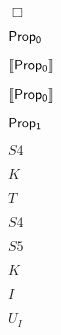 \documentclass[10pt]{book}
\begin{document}
\begin{mdSnippets}
\begin{mdInlineSnippet}[c3880bc63c2b0fd10cdc024cf76a1924]%
$\Box$\end{mdInlineSnippet}%
\begin{mdInlineSnippet}[c09859c00da566980873081e8d77a317]%
${\sf Prop_0}$\end{mdInlineSnippet}%
\begin{mdInlineSnippet}[6abfdac12c5881728b0774166e4c6328]%
$\llbracket{\sf Prop_0}\rrbracket$\end{mdInlineSnippet}%
\begin{mdInlineSnippet}[6abfdac12c5881728b0774166e4c6328]%
$\llbracket{\sf Prop_0}\rrbracket$\end{mdInlineSnippet}%
\begin{mdInlineSnippet}[1adbe235087fa8958bc806a79b07b5cf]%
${\sf Prop_1}$\end{mdInlineSnippet}%
\begin{mdInlineSnippet}%
$S4$\end{mdInlineSnippet}%
\begin{mdInlineSnippet}[a5f3c6a11b03839d46af9fb43c97c188]%
$K$\end{mdInlineSnippet}%
\begin{mdInlineSnippet}%
$T$\end{mdInlineSnippet}%
\begin{mdInlineSnippet}%
$S4$\end{mdInlineSnippet}%
\begin{mdInlineSnippet}[79e6fb8fb2403b9688924408f7dc4857]%
$S5$\end{mdInlineSnippet}%
\begin{mdInlineSnippet}[a5f3c6a11b03839d46af9fb43c97c188]%
$K$\end{mdInlineSnippet}%
\begin{mdInlineSnippet}[dd7536794b63bf90eccfd37f9b147d7f]%
$I$\end{mdInlineSnippet}%
\begin{mdInlineSnippet}[49b0e954e304a740c242c3d4a3a95b27]%
$U_I$\end{mdInlineSnippet}%
\begin{mdInlineSnippet}[ca9382308bb1896e0eca7d2150323a62]%

\end{mdInlineSnippet}
\end{mdSnippets}
\end{document}
